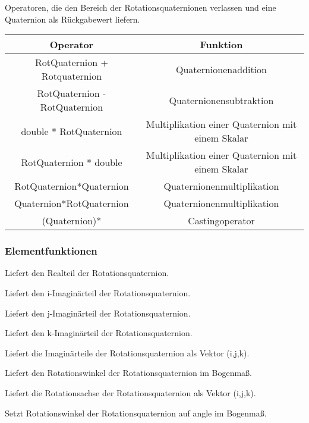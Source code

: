 	Operatoren, die den Bereich der Rotationsquaternionen verlassen und eine Quaternion als
	Rückgabewert liefern.
	
	\begin{tabular}{|c|c|}
			\hline
			Operator & Funktion\\ 
			\hline
			RotQuaternion + Rotquaternion & Quaternionenaddition\\
			\hline
			RotQuaternion - RotQuaternion & Quaternionensubtraktion\\
			\hline
			double * RotQuaternion & Multiplikation einer Quaternion mit einem Skalar\\
			\hline
			RotQuaternion * double & Multiplikation einer Quaternion mit einem Skalar\\
			\hline
			RotQuaternion*Quaternion & Quaternionenmultiplikation\\
			\hline
			Quaternion*RotQuaternion & Quaternionenmultiplikation\\
			\hline
			(Quaternion)* & Castingoperator
	\end{tabular}
	
	\subsubsection{Elementfunktionen}
		\descr
		{
			Liefert den Realteil der Rotationsquaternion.
		}
		
		\descr
		{
			Liefert den i-Imaginärteil der Rotationsquaternion.
		}
		
		\descr
		{
			Liefert den j-Imaginärteil der Rotationsquaternion.
		}
		
		\descr
		{
			Liefert den k-Imaginärteil der Rotationsquaternion.
		}
		
    \descr
    {
    	Liefert die Imaginärteile der Rotationsquaternion als Vektor (i,j,k).
    }
    
    \descr
    {
    	Liefert den Rotationswinkel der Rotationsquaternion im Bogenmaß.
    }
    
    \descr
    {
    	Liefert die Rotationsachse der Rotationsquaternion als Vektor (i,j,k).
    }
    
    \descr
    {
    	Setzt Rotationswinkel der Rotationsquaternion auf angle im Bogenmaß.
    }
    
